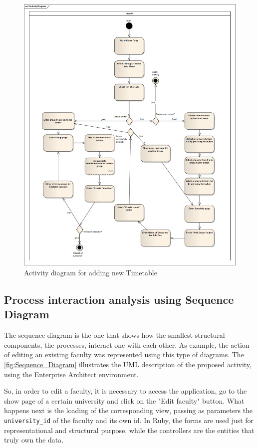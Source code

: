 \begin{figure}[H]
\centering
\includegraphics[width=18cm]{Chapter2/Add_Timetable_Activity_Diagram.png}
\caption{Activity diagram for adding new Timetable}
\label{fig:Add_Timetable_Activity_Diagram}
\end{figure}

\newpage
\subsection{Process interaction analysis using Sequence Diagram}
The sequence diagram is the one that shows how the smallest structural components, the processes, interact one with each other. As example, the action of editing an existing faculty was represented using this type of diagrams. The \autoref{fig:Sequence_Diagram} illustrates the UML description of the proposed activity, using the Enterprise Architect environment. 

So, in order to edit a faculty, it is necessary to access the application, go to the show page of a certain university and click on the "Edit faculty" button. What happens next is the loading of the corresponding view, passing as parameters the \texttt{university\_id} of the faculty and its own id. In Ruby, the forms are used just for representational and structural purpose, while the controllers are the entities that truly own the data. 

